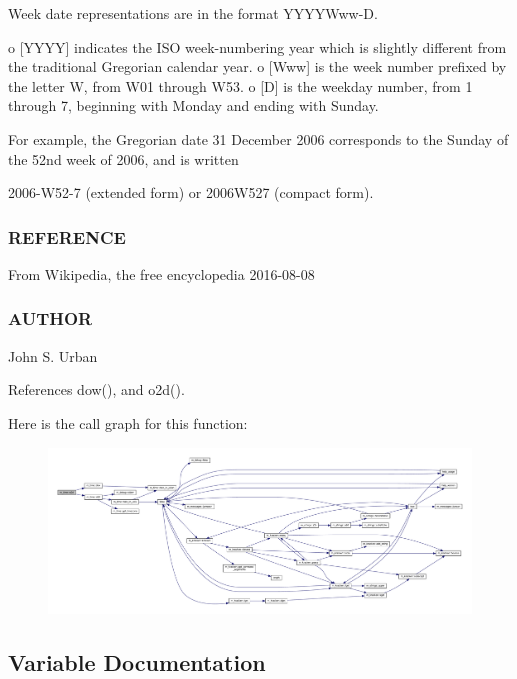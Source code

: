 \begin{DoxyVerb}
Week date representations are in the format Y\+Y\+Y\+Y\+Www-\/D.

o \mbox{[}Y\+Y\+YY\mbox{]} indicates the I\+SO week-\/numbering year which is slightly different from the traditional Gregorian calendar year. o \mbox{[}Www\mbox{]} is the week number prefixed by the letter W, from W01 through W53. o \mbox{[}D\mbox{]} is the weekday number, from 1 through 7, beginning with Monday and ending with Sunday.

For example, the Gregorian date 31 December 2006 corresponds to the Sunday of the 52nd week of 2006, and is written

2006-\/\+W52-\/7 (extended form) or 2006\+W527 (compact form).

\subsubsection*{R\+E\+F\+E\+R\+E\+N\+CE}

From Wikipedia, the free encyclopedia 2016-\/08-\/08

\subsubsection*{A\+U\+T\+H\+OR}

John S. Urban 

References dow(), and o2d().

Here is the call graph for this function\+:
\nopagebreak
\begin{figure}[H]
\begin{center}
\leavevmode
\includegraphics[width=350pt]{namespacem__time_ac0ec48db8d508bfa23fe4b20c9d1c5a3_cgraph}
\end{center}
\end{figure}


\subsection{Variable Documentation}
\mbox{\label{namespacem__time_a97725f8d657c24badff19a794f323a6b}} 

\end{DoxyVerb}
